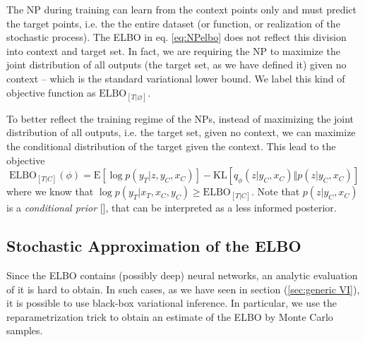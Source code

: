 The NP during training can learn from the context points only and must predict the target points, i.e. the the entire dataset (or function, or realization of the stochastic process). The ELBO in eq. \eqref{eq:NPelbo} does not reflect this division into context and target set. In fact, we are requiring the NP to maximize the joint distribution of all outputs (the target set, as we have defined it) given no context -- which is the standard variational lower bound. We label this kind of objective function as $\mathrm{ELBO}_{[T|\varnothing]}$.

To better reflect the training regime of the NPs, instead of maximizing the joint distribution of all outputs, i.e. the target set, given no context, we can maximize the conditional distribution of the target given the context. This lead to the objective
\begin{equation}\label{eq:ELBOcond}
    \mathrm{ELBO}_{[T|C]}(\phi) = \mathrm{E}[\log p(y_T|z,y_C, x_C)] - \mathrm{KL}[q_\phi(z|y_C, x_C)\Vert p(z|y_C, x_C)]
\end{equation}
where we know that $\log p(y_T|x_T, x_C, y_C) \geq \mathrm{ELBO}_{[T|C]}$. Note that $p(z|y_C, x_C)$ is a \textit{conditional prior} [\cite{Garnelo2018b}], that can be interpreted as a less informed posterior.



\subsection{Stochastic Approximation of the ELBO}
Since the ELBO contains (possibly deep) neural networks, an analytic evaluation of it is hard to obtain. In such cases, as we have seen in section (\cref{sec:generic VI}), it is possible to use black-box variational inference. In particular, we use the reparametrization trick to obtain an estimate of the ELBO by Monte Carlo samples.


